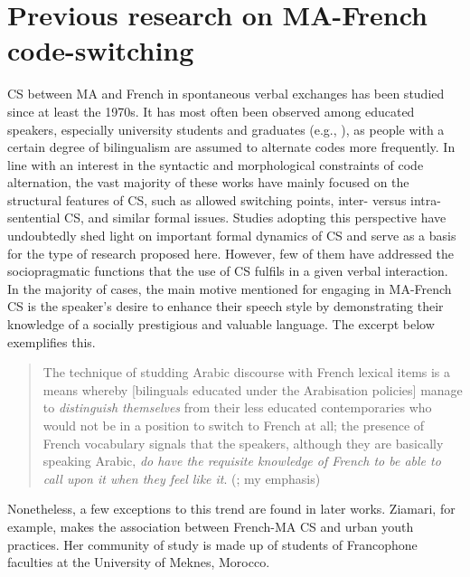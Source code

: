 \documentclass[output=paper]{langscibook}
\begin{document}
\section{Previous research on \gls*{MA}-French code-switching}

\gls*{CS} between \gls*{MA} and French in spontaneous verbal exchanges has been studied since at least the 1970s. It has most often been observed among educated speakers, especially university students and graduates (e.g., \citealt{abbassi_sociolinguistic_1977,bentahila_syntax_1983,bentahila_patterns_1995,lahlou_morpho-syntactic_1991,ennaji_multilingualism_2005, ziamari_development_2007,ziamari_moroccan_2009,ziamari_determiner_2018,post_impact_2015}), as people with a certain degree of bilingualism are assumed to alternate codes more frequently. In line with an interest in the syntactic and morphological constraints of code alternation, the vast majority of these works have mainly focused on the structural features of \gls*{CS}, such as allowed switching points, inter- versus intra-sentential \gls*{CS}, and similar formal issues. Studies adopting this perspective have undoubtedly shed light on important formal dynamics of \gls*{CS} and serve as a basis for the type of research proposed here. However, few of them have addressed the sociopragmatic functions that the use of \gls*{CS} fulfils in a given verbal interaction. In the majority of cases, the main motive mentioned for engaging in \gls*{MA}-French \gls*{CS} is the speaker’s desire to enhance their speech style by demonstrating their knowledge of a socially prestigious and valuable language. The excerpt below exemplifies this.


\begin{quote}
	The technique of studding Arabic discourse with French lexical items is a means whereby [bilinguals educated under the Arabisation policies] manage to \textit{distinguish themselves} from their less educated contemporaries who would not be in a position to switch to French at all; the presence of French vocabulary signals that the speakers, although they are basically speaking Arabic, \textit{do have the requisite knowledge of French to be able to call upon it when they feel like it}. (\citealt[84]{bentahila_patterns_1995}; my emphasis)
\end{quote}

\noindent %
Nonetheless, a few exceptions to this trend are found in later works. Ziamari, for example, makes the association between French-\gls*{MA} \gls*{CS} and urban youth practices. Her community of study is made up of students of Francophone faculties at the University of Meknes, Morocco.
\end{document}
